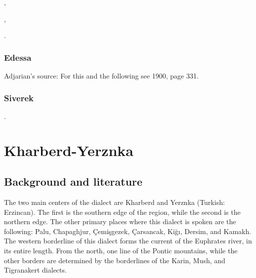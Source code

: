 ,

,

.



\subsection{Edessa}

Adjarian's source: For this and the following see  1900, page 331. 


\subsection{Siverek}

.



\chapter{Kharberd-Yerznka} \label{chapter:Kharberd-Yerznka}

\section{Background and literature}
\begin{adjarianpage}\label{page:167}\end{adjarianpage}%

The two main centers of the dialect are Kharberd and Yerznka (Turkish: Erzincan). The first is the southern edge of the region, while the second is the northern edge. The other primary places where this dialect is spoken are the following: Palu, Chapaghjur, Çemişgezek, Çarsancak, Kiğı, Dersim, and Kamakh. The western borderline of this dialect forms the current of the Euphrates river, in its entire length. From the north, one line of the Pontic mountains, while the other borders are determined by the borderlines of the Karin, Mush, and Tigranakert dialects. 

